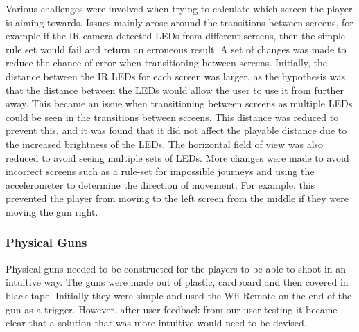 \documentclass[a4paper,11pt]{article}
\begin{document}
Various challenges were involved when trying to calculate which screen the player is aiming towards. Issues mainly arose around the transitions between screens, for example if the IR camera detected LEDs from different screens, then the simple rule set would fail and return an erroneous result. A set of changes was made to reduce the chance of error when transitioning between screens. Initially, the distance between the IR LEDs for each screen was larger, as the hypothesis was that the distance between the LEDs would allow the user to use it from further away. This became an issue when transitioning between screens as multiple LEDs could be seen in the transitions between screens. This distance was reduced to prevent this, and it was found that it did not affect the playable distance due to the increased brightness of the LEDs. The horizontal field of view was also reduced to avoid seeing multiple sets of LEDs. More changes were made to avoid incorrect screens such as a rule-set for impossible journeys and using the accelerometer to determine the direction of movement. For example, this prevented the player from moving to the left screen from the middle if they were moving the gun right. 

\subsubsection{Physical Guns}
Physical guns needed to be constructed for the players to be able to shoot in an intuitive way. The guns were made out of plastic, cardboard and then covered in black tape. Initially they were simple and used the Wii Remote on the end of the gun as a trigger. However, after user feedback from our user testing it  became clear that a solution that was more intuitive would need to be devised.
\end{document}
